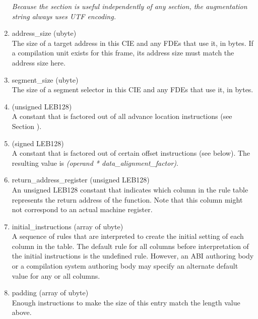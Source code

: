 \begin{enumerate}[1.]
\textit{Because the  section is useful independently of
any  section, the augmentation string always uses
UTF encoding.}

\item  address\_size (ubyte) \\
The size of a target address
in this CIE and any FDEs that
use it, in bytes. If a compilation unit exists for this frame,
its address size must match the address size here.

\item  segment\_size (ubyte) \\
The size of a segment selector in this CIE and any FDEs that
use it, in bytes.

\item  {} (unsigned LEB128) \\
A 
constant that is factored out of all advance location
instructions (see 
Section ).


\item  {} (signed LEB128) \\
A 
constant that is factored out of certain offset instructions
(see below). The resulting value is  \textit{(operand *
data\_alignment\_factor)}.

\item  return\_address\_register (unsigned LEB128) \\
An unsigned LEB128 constant that indicates which column in the
rule table represents the return address of the function. Note
that this column might not correspond to an actual machine
register.

\item initial\_instructions (array of ubyte) \\
A sequence of rules that are interpreted to create the initial
setting of each column in the table.  The default rule for
all columns before interpretation of the initial instructions
is the undefined rule. However, an ABI authoring body or a
compilation system authoring body may specify an alternate
default value for any or all columns.

\item padding (array of ubyte) \\
Enough  instructions to make the size of this entry
match the length value above.
\end{enumerate}

